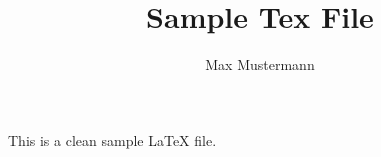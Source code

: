\documentclass{article}
\title{Sample Tex File}
\author{Max Mustermann}
\begin{document}
\maketitle
This is a clean sample LaTeX file.
\end{document}

